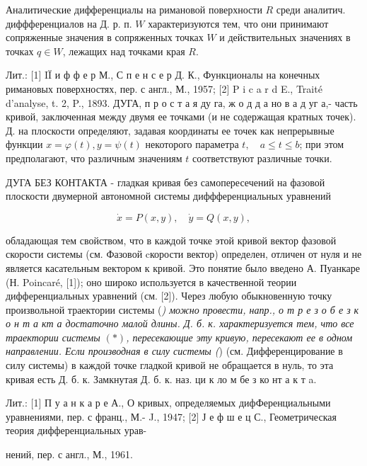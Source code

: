 \documentclass[10pt]{article}
\begin{document}
Аналитические дифференциалы на римановой поверхности $R$ среди аналитич. диффференциалов на Д. р. п. $W$ характеризуются тем, что они принимают сопряженные значения в сопряженных точках $W$ и действительных значениях в точках $q \in W$, лежащих над точками края $R$.



Лит.: [1] IÏ и ф ф е р М., С п е н с е р Д. К., Функционалы на конечных римановых поверхностях, пер. с англ., М., 1957; [2] P i c a r d E., Traité d'analyse, t. 2, P., 1893. ДУГА, п р о с т а я ду га, ж о д д а но в а д уг а,- часть кривой, заключенная между двумя ее точками (и не содержащая кратных точек). Д. на плоскости определяют, задавая координаты ее точек как непрерывные функции $x=\varphi(t), y=\psi(t)$ некоторого параметра $t, \quad a \leqslant t \leqslant b$; при этом предполагают, что различным значениям $t$ соответствуют различные точки.



ДУГА БЕЗ КОНТАКТА - гладкая кривая без самопересечений на фазовой плоскости двумерной автономной системы диффференциальных уравнений



\[

\dot{x}=P(x, y), \quad \dot{y}=Q(x, y),

\]



обладающая тем свойством, что в каждой точке этой кривой вектор фазовой скорости системы (см. Фазовой cкорости вектор) определен, отличен от нуля и не является касательным вектором к кривой. Это понятие было введено А. Пуанкаре (Н. Poincaré, [1]); оно широко используется в качественной теории дифференциальных уравнений (см. [2]). Через любую обыкновенную точку произвольной траектории системы (\textit{) можно провести, напр., о т р е з о б е з к о н т а кт а достаточно малой длины. Д. б. к. характеризуется тем, что все траектории системы $(*)$, пересекающие эту кривую, пересекают ее в одном направлении. Если производная в силу системы (}) (см. Дифференцирование в силу системы) в каждой точке гладкой кривой не обращается в нуль, то эта кривая есть Д. б. к. Замкнутая Д. б. к. наз. ци к ло м бе з ко нт а к т a.



Лит.: [1] П у а н к а р е А., О кривых, определяемых дифФеренциальными уравнениями, пер. с франц., М.- J., 1947; [2] Ј е ф ш е ц С., Геометрическая теория дифференциальных урав-

нений, пер. с англ., М., 1961.
\end{document}
